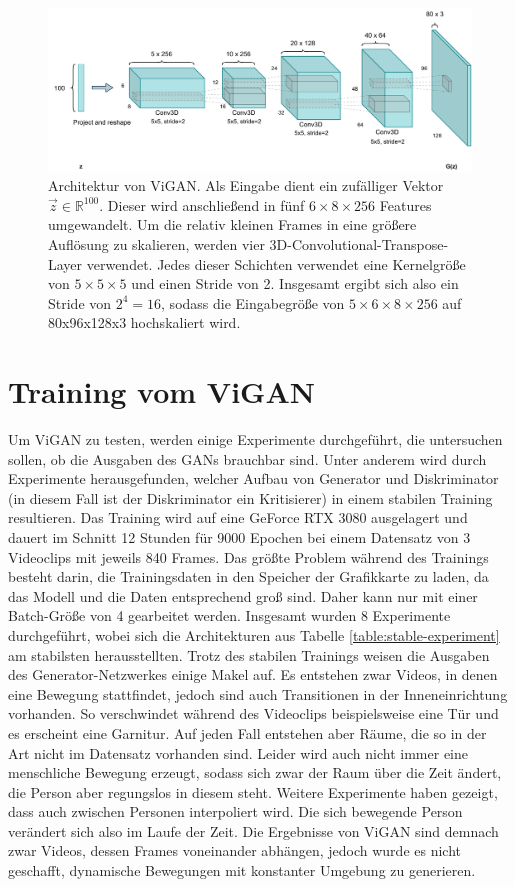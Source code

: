 \begin{figure}
    \centering
    \includegraphics[width=\textwidth]{images/ViGAN.pdf}
    \caption{Architektur von ViGAN. Als Eingabe dient ein zufälliger Vektor $\vec{z}
    \in \mathbb{R}^{100}$. Dieser wird anschließend in fünf $6 \times 8 \times
    256$ Features umgewandelt. Um die relativ kleinen Frames in eine größere
    Auflösung zu skalieren, werden vier 3D-Convolutional-Transpose-Layer verwendet. Jedes
    dieser Schichten verwendet eine Kernelgröße von $5 \times 5 \times 5$ und
    einen Stride von 2.  Insgesamt ergibt sich also ein Stride von $2^4 = 16$,
    sodass die Eingabegröße von $5 \times 6 \times 8 \times 256$ auf 80x96x128x3
    hochskaliert wird.}
    \label{fig:vigan}
\end{figure}

\section{Training vom ViGAN}
Um ViGAN zu testen, werden einige Experimente durchgeführt, die untersuchen
sollen, ob die Ausgaben des GANs brauchbar sind. Unter anderem wird durch
Experimente herausgefunden, welcher Aufbau von Generator und Diskriminator (in
diesem Fall ist der Diskriminator ein Kritisierer) in einem stabilen Training
resultieren. Das Training wird auf eine GeForce RTX 3080 ausgelagert und dauert
im Schnitt 12 Stunden für 9000 Epochen bei einem Datensatz von 3 Videoclips mit
jeweils 840 Frames. Das größte Problem während des Trainings besteht darin, die
Trainingsdaten in den Speicher der Grafikkarte zu laden, da das Modell und die
Daten entsprechend groß sind. Daher kann nur mit einer Batch-Größe von 4
gearbeitet werden. Insgesamt wurden 8 Experimente durchgeführt, wobei sich die
Architekturen aus Tabelle \ref{table:stable-experiment} am stabilsten
herausstellten. Trotz des stabilen Trainings weisen die Ausgaben des
Generator-Netzwerkes einige Makel auf. Es entstehen zwar Videos, in denen eine
Bewegung stattfindet, jedoch sind auch Transitionen in der Inneneinrichtung
vorhanden. So verschwindet während des Videoclips beispielsweise eine Tür und es
erscheint eine Garnitur. Auf jeden Fall entstehen aber Räume, die so in der Art
nicht im Datensatz vorhanden sind. Leider wird auch nicht immer eine menschliche
Bewegung erzeugt, sodass sich zwar der Raum über die Zeit ändert, die Person
aber regungslos in diesem steht. Weitere Experimente haben gezeigt, dass auch
zwischen Personen interpoliert wird. Die sich bewegende Person verändert sich
also im Laufe der Zeit. Die Ergebnisse von ViGAN sind demnach zwar Videos,
dessen Frames voneinander abhängen, jedoch wurde es nicht geschafft, dynamische
Bewegungen mit konstanter Umgebung zu generieren.

